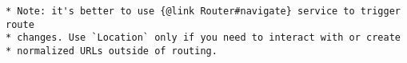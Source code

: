 \begin{verbatim}
* Note: it's better to use {@link Router#navigate} service to trigger route
* changes. Use `Location` only if you need to interact with or create
* normalized URLs outside of routing.
\end{verbatim}
